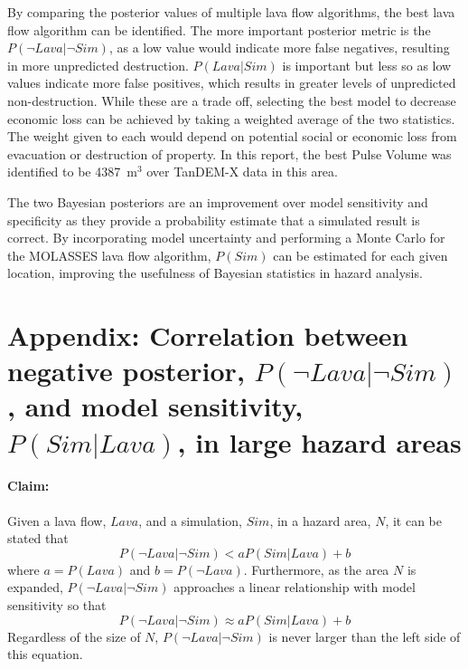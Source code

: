 \documentclass[12pt,letter]{article}
\begin{document}
By comparing the posterior values of multiple lava flow algorithms, the best lava flow algorithm can be identified. The more important posterior metric is the $P(\neg Lava|\neg Sim)$, as a low value would indicate more false negatives, resulting in more unpredicted destruction. $P(Lava|Sim)$ is important but less so as low values indicate more false positives, which results in greater levels of unpredicted non-destruction. While these are a trade off, selecting the best model to decrease economic loss can be achieved by taking a weighted average of the two statistics. The weight given to each would depend on potential social or economic loss from evacuation or destruction of property. In this report, the best Pulse Volume was identified to be 4387~m$^3$ over TanDEM-X data in this area.

The two Bayesian posteriors are an improvement over model sensitivity and specificity as they provide a probability estimate that a simulated result is correct. By incorporating model uncertainty and performing a Monte Carlo for the MOLASSES lava flow algorithm, $P(Sim)$ can be estimated for each given location, improving the usefulness of Bayesian statistics in hazard analysis.





\section*{Appendix: Correlation between negative posterior, $P(\neg Lava|\neg Sim)$, and model sensitivity, $P(Sim|Lava)$, in large hazard areas}
\paragraph{Claim:} Given a lava flow, $Lava$, and a simulation, $Sim$, in a hazard area, $N$, it can be stated that
\begin{equation}
P(\neg Lava|\neg Sim) < aP(Sim|Lava)+b
\label{eqap_neglin}
\end{equation}
where $a=P(Lava)$ and $b= P(\neg Lava)$. Furthermore, as the area $N$ is expanded, $P(\neg Lava|\neg Sim)$ approaches a linear relationship with model sensitivity so that
\begin{equation}
P(\neg Lava|\neg Sim)\approx aP(Sim|Lava)+b
\end{equation}
Regardless of the size of $N$, $P(\neg Lava|\neg Sim)$ is never larger than the left side of this equation.
\end{document}
